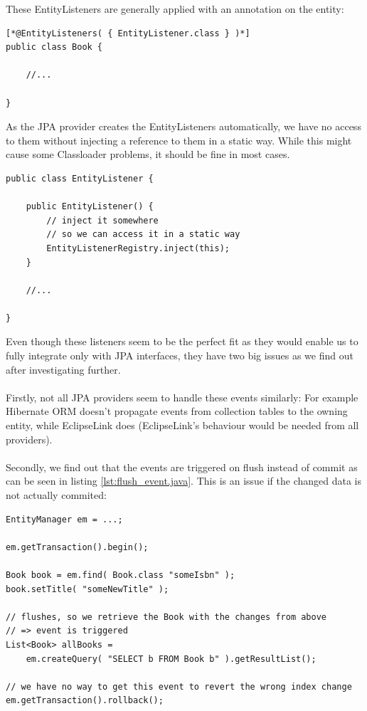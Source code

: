 \noindent
These EntityListeners are generally applied with an annotation on the entity:
\\
\lstset{language=java}
\begin{lstlisting}[frame=htrbl, caption={Using a JPA entity listener}, label={lst:using_jpa_entitylisteners.java}]
[*@EntityListeners( { EntityListener.class } )*]
public class Book {

	//...

}
\end{lstlisting}
\noindent
As the JPA provider creates the EntityListeners automatically, we have no access to them without injecting a reference to them in a static way. While this might cause some Classloader problems, it should be fine in most cases.
\\
\lstset{language=java}
\begin{lstlisting}[frame=htrbl, caption={Injecting the EntityListener}, label={lst:jpa_entity_listener.java}]
public class EntityListener {

	public EntityListener() {
		// inject it somewhere
		// so we can access it in a static way
		EntityListenerRegistry.inject(this);
	}

	//...

}
\end{lstlisting}

\pagebreak

\noindent
Even though these listeners seem to be the perfect fit as they would enable us to fully integrate only with JPA interfaces, they have two big issues as we find out after investigating further.
\\\\
Firstly, not all JPA providers seem to handle these events similarly: For example Hibernate ORM doesn't propagate events from collection tables to the owning entity, while EclipseLink does (EclipseLink's behaviour would be needed from all providers).
\\\\
Secondly, we find out that the events are triggered on flush instead of commit as can be seen in listing \ref{lst:flush_event.java}. This is an issue if the changed data is not actually commited:
\\

\lstset{language=java}
\begin{lstlisting}[frame=htrbl, caption={Event triggering on flush}, label={lst:flush_event.java}]
EntityManager em = ...;

em.getTransaction().begin();

Book book = em.find( Book.class "someIsbn" );
book.setTitle( "someNewTitle" );

// flushes, so we retrieve the Book with the changes from above
// => event is triggered
List<Book> allBooks = 
	em.createQuery( "SELECT b FROM Book b" ).getResultList();

// we have no way to get this event to revert the wrong index change
em.getTransaction().rollback();
\end{lstlisting}


